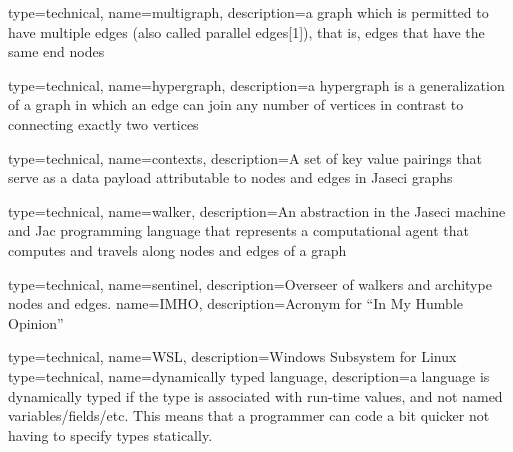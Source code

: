 {
    type=technical,
    name=multigraph,
    description={a graph which is permitted to have multiple edges (also called parallel edges[1]), that is, edges that have the same end nodes}
}

{
    type=technical,
    name=hypergraph,
    description={a hypergraph is a generalization of a graph in which an edge can join any number of vertices in contrast to connecting exactly two vertices}
}

{
    type=technical,
    name=contexts,
    description={A set of key value pairings that serve as a data payload attributable to nodes and edges in Jaseci graphs}
}

{
    type=technical,
    name=walker,
    description={An abstraction in the Jaseci machine and Jac programming language that represents a computational agent that computes and travels along nodes and edges of a graph}
}

{
    type=technical,
    name=sentinel,
    description={Overseer of walkers and architype nodes and edges.}
}
{
    name=IMHO,
    description={Acronym for ``In My Humble Opinion''}
}

{
    type=technical,
    name=WSL,
    description={Windows Subsystem for Linux}
}
{
    type=technical,
    name=dynamically typed language,
    description={a language is dynamically typed if the type is associated with run-time values, and not named variables/fields/etc. This means that a programmer can code a bit quicker not having to specify types statically.}
}